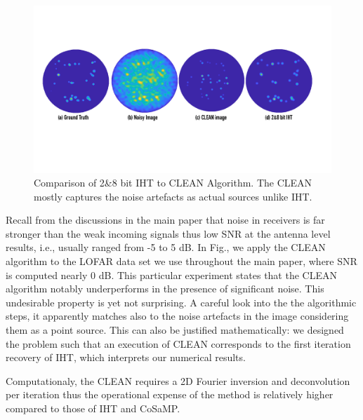\documentclass{article}
\begin{document}
\begin{figure}[t!]
\centering
\includegraphics[width=1\columnwidth, angle=0]{figs/clean_image.pdf}
\caption{Comparison of 2\&8 bit IHT to CLEAN Algorithm. The CLEAN mostly captures the noise artefacts as actual sources unlike IHT.}
\label{fig:clean}
\end{figure}
Recall from the discussions in the main paper that noise in receivers is far stronger than the weak incoming signals thus low SNR at the antenna level results, i.e., usually ranged from -5 to 5 dB. In Fig., we apply the CLEAN algorithm to the LOFAR data set we use throughout the main paper, where SNR is computed nearly 0 dB. This particular experiment states that the CLEAN algorithm notably underperforms in the presence of significant noise. This undesirable property is yet not surprising. A careful look into the the algorithmic steps, it apparently matches also to the noise artefacts in the image considering them as a point source. This can also be justified mathematically: we designed the problem such that an execution of {CLEAN} corresponds to the first iteration recovery of IHT, which interprets our numerical results. 

Computationaly, the CLEAN requires a 2D Fourier inversion and deconvolution per iteration thus the operational expense of the method is relatively higher compared to those of IHT and CoSaMP. 

% 
% 
\end{document}
